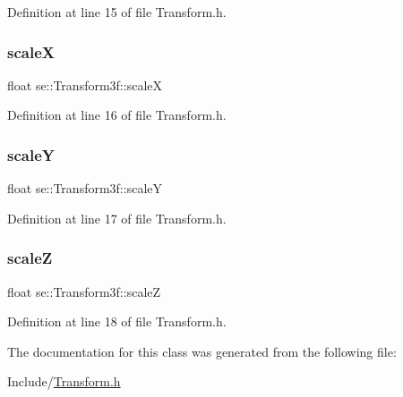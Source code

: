 Definition at line 15 of file Transform.\+h.

\mbox{\label{classse_1_1_transform3f_af87cb468268b871f516059ab9f84035f}} 
\subsubsection{\texorpdfstring{scaleX}{scaleX}}
{\footnotesize\ttfamily float se\+::\+Transform3f\+::scaleX}



Definition at line 16 of file Transform.\+h.

\mbox{\label{classse_1_1_transform3f_abc893c842f0fcbfe910b48b38e56a241}} 
\subsubsection{\texorpdfstring{scaleY}{scaleY}}
{\footnotesize\ttfamily float se\+::\+Transform3f\+::scaleY}



Definition at line 17 of file Transform.\+h.

\mbox{\label{classse_1_1_transform3f_af25deb0eb4f11f5f3e1f369a86bb3a91}} 
\subsubsection{\texorpdfstring{scaleZ}{scaleZ}}
{\footnotesize\ttfamily float se\+::\+Transform3f\+::scaleZ}



Definition at line 18 of file Transform.\+h.



The documentation for this class was generated from the following file\+:\begin{DoxyCompactItemize}
\item 
Include/\mbox{\hyperlink{_transform_8h}{Transform.\+h}}\end{DoxyCompactItemize}
